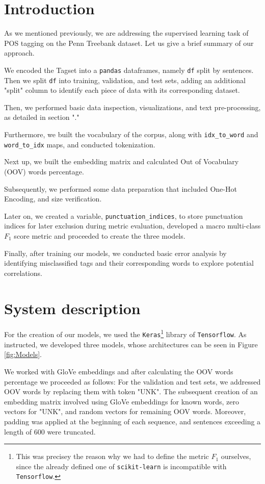 \documentclass[11pt]{article}
\begin{document}
\section{Introduction}

As we mentioned previously, we are addressing the supervised learning task of POS tagging on the Penn Treebank dataset. Let us give a brief summary of our approach.

We encoded the Tagset into a \texttt{pandas} dataframes, namely \texttt{df} split by sentences. Then we split \texttt{df} into training, validation, and test sets, adding an additional "split" column to identify each piece of data with its corresponding dataset.

Then, we performed basic data inspection, visualizations, and text pre-processing, as detailed in section "."

Furthermore, we built the vocabulary of the corpus, along with \texttt{idx\_to\_word} and \texttt{word\_to\_idx} maps, and conducted tokenization.

Next up, we built the embedding matrix and calculated Out of Vocabulary (OOV) words percentage.

Subsequently, we performed some data preparation that included One-Hot Encoding, and size verification.

Later on, we created a variable, \texttt{punctuation\_indices}, to store punctuation indices for later exclusion during metric evaluation, developed a macro multi-class $F_1$ score metric and proceeded to create the three models.

Finally, after training our models, we conducted basic error analysis by identifying misclassified tags and their corresponding words to explore potential correlations.


\section{System description}
\label{sec:system}

For the creation of our models, we used the \texttt{Keras}\footnote{This was precisey the reason why we had to define the metric $F_1$ ourselves, since the already defined one of \texttt{scikit-learn} is incompatible with \texttt{Tensorflow}.} library of \texttt{Tensorflow}. As instructed, we developed three models, whose architectures can be seen in Figure \ref{fig:Models}.

We worked with GloVe embeddings and after calculating the OOV words percentage we proceeded as follows: For the validation and test sets, we addressed OOV words by replacing them with token "UNK". The subsequent creation of an embedding matrix involved using GloVe embeddings for known words, zero vectors for "UNK", and random vectors for remaining OOV words. Moreover, padding was applied at the beginning of each sequence, and sentences exceeding a length of 600 were truncated.
\end{document}
